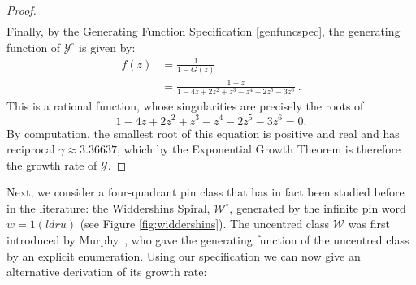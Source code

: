 \documentclass[11pt,a4paper]{article}
\theoremstyle{definition}
\begin{document}
\begin{proof}
\[\begin{split}
\end{split}
\]
Finally, by the Generating Function Specification \ref{genfuncspec}, the generating function of $\mathcal{Y}^{\circ}$ is given by:
\[
\begin{split}
f(z) & = \frac{1}{1 - G(z)} \\
 & = \frac{1-z}{1-4z+2z^{2}+z^{3}-z^{4}-2z^{5}-3z^{6}} \ .
\end{split}
\]
This is a rational function, whose singularities are precisely the roots of
\[
1-4z+2z^{2}+z^{3}-z^{4}-2z^{5}-3z^{6} = 0.
\]
By computation, the smallest root of this equation is positive and real and has reciprocal $\gamma \approx 3.36637$, which by the Exponential Growth Theorem is therefore the growth rate of $\mathcal{Y}$.\end{proof}

Next, we consider a four-quadrant pin class that has in fact been studied before in the literature: the Widdershins Spiral, $\mathcal{W}^{\circ}$, generated by the infinite pin word $w = 1\overline{(ldru)}$ (see Figure \ref{fig:widdershins}). The uncentred class $\mathcal{W}$ was first introduced by Murphy~\cite{murphy:restricted-perm:}, who gave the generating function of the uncentred class by an explicit enumeration. Using our specification we can now give an alternative derivation of its growth rate:
\end{document}
